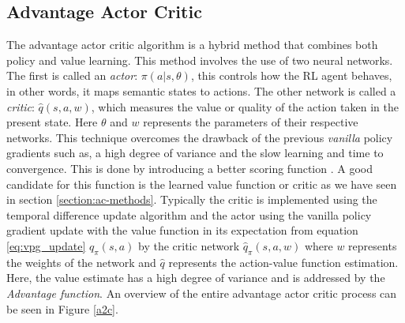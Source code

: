 \documentclass[12pt]{extarticle}
\numberwithin{equation}{section}
\begin{document}
	\subsection{Advantage Actor Critic}	\label{a2c-section}
	The advantage actor critic algorithm is a hybrid method that combines both policy and value learning. This method involves the use of two neural networks. The first is called an \textit{actor}: $\pi(a|s,\theta)$, this controls how the RL agent behaves, in other words, it maps semantic states to actions. The other network is called a \textit{critic}: $\hat{q}(s,a,w)$, which measures the value or quality of the action taken in the present state. Here $\theta$ and $w$ represents the parameters of their respective networks. This technique overcomes the drawback of the previous \textit{vanilla} policy gradients such as, a high degree of variance and the slow learning and time to convergence. This is done by introducing a better scoring function \cite{Sutton_pg}. A good candidate for this function is the learned value function or critic as we have seen in section \ref{section:ac-methods}. Typically the critic is implemented using the temporal difference update algorithm and the actor using the vanilla policy gradient update with the value function in its expectation from equation \ref{eq:vpg_update} $q_{\pi}(s,a)$ by the critic network $\hat{q}_{\pi}(s,a,w)$ where $w$ represents the weights of the network and $\hat{q}$ represents the action-value function estimation. Here, the value estimate has a high degree of variance and is addressed by the \textit{Advantage function}. An overview of the entire advantage actor critic process can be seen in Figure \ref{a2c}.
\end{document}
